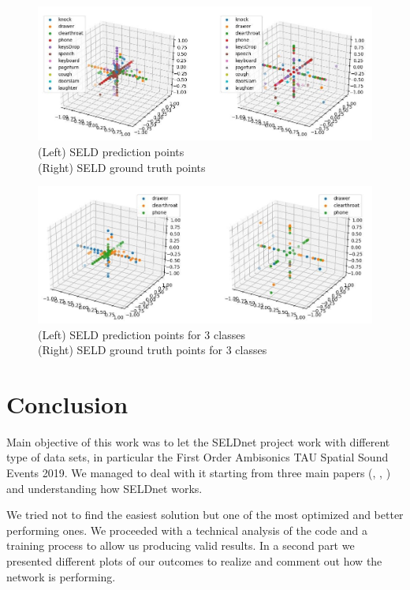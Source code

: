 \documentclass[11pt]{article}
\begin{document}
\newpage
\begin{figure}[h!]
	\centering
	\hspace*{-2.5cm}
	\includegraphics[width=17.7cm]{img/plot_labels.jpg}
	\caption{(Left) SELD prediction points\\ (Right) SELD ground truth points}
	\label{fig:plot_labels}
\end{figure}

\begin{figure}[h!]
	\centering
	\hspace*{-2.5cm}
	\includegraphics[width=17.7cm]{img/plot_3labels.jpg}
	\caption{(Left) SELD prediction points for 3 classes\\ (Right) SELD ground truth points for 3 classes}
	\label{fig:plot_3labels}
\end{figure}


\newpage
\section{Conclusion}\label{cha:conc}

Main objective of this work was to let the SELDnet project work with different type of data sets, in particular the First Order Ambisonics TAU Spatial Sound Events 2019. We managed to deal with it starting from three main papers (\cite{paper2020}, \cite{paper2019}, \cite{paper2018}) and understanding how SELDnet works.

\noindent
We tried not to find the easiest solution but one of the most optimized and better performing ones. We proceeded with a technical analysis of the code and a training process to allow us producing valid results. In a second part we presented different plots of our outcomes to realize and comment out how the network is performing. 
\end{document}
